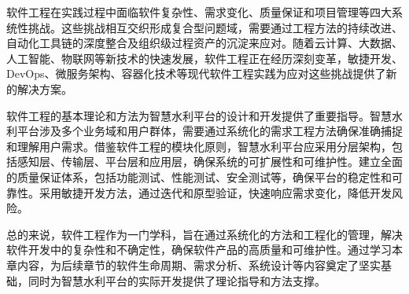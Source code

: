 软件工程在实践过程中面临软件复杂性、需求变化、质量保证和项目管理等四大系统性挑战。这些挑战相互交织形成复合型问题域，需要通过工程方法的持续改进、自动化工具链的深度整合及组织级过程资产的沉淀来应对。随着云计算、大数据、人工智能、物联网等新技术的快速发展，软件工程正在经历深刻变革，敏捷开发、DevOps、微服务架构、容器化技术等现代软件工程实践为应对这些挑战提供了新的解决方案。

软件工程的基本理论和方法为智慧水利平台的设计和开发提供了重要指导。智慧水利平台涉及多个业务域和用户群体，需要通过系统化的需求工程方法确保准确捕捉和理解用户需求。借鉴软件工程的模块化原则，智慧水利平台应采用分层架构，包括感知层、传输层、平台层和应用层，确保系统的可扩展性和可维护性。建立全面的质量保证体系，包括功能测试、性能测试、安全测试等，确保平台的稳定性和可靠性。采用敏捷开发方法，通过迭代和原型验证，快速响应需求变化，降低开发风险。

总的来说，软件工程作为一门学科，旨在通过系统化的方法和工程化的管理，解决软件开发中的复杂性和不确定性，确保软件产品的高质量和可维护性。通过学习本章内容，为后续章节的软件生命周期、需求分析、系统设计等内容奠定了坚实基础，同时为智慧水利平台的实际开发提供了理论指导和方法支撑。


